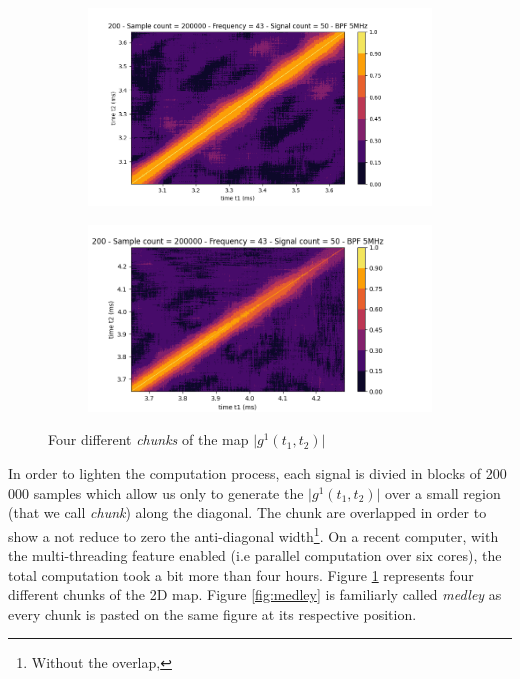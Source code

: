 \documentclass[11pt]{report}
\begin{document}
\begin{figure}[h!]
\centering
\begin{subfigure}{.48\textwidth}
  \centering
  \includegraphics[width=1.1\linewidth]{sp-g12-4}
\end{subfigure}%
\hspace{1em}%
\begin{subfigure}{.48\textwidth}
  \centering
  \includegraphics[width=1.1\linewidth]{sp-g12-2}
\end{subfigure}
\caption{Four different \textit{chunks} of the map $\vert g^1(t_1, t_2) \vert$}
\label{fig:sp-g12}
\end{figure}

In order to lighten the computation process, each signal is divied in blocks of 200 000 samples which allow us only to generate the $\vert g^1(t_1, t_2) \vert$ over a small region (that we call \textit{chunk}) along the diagonal. The chunk are overlapped in order to show a not reduce to zero the anti-diagonal width\footnote{Without the overlap, }. On a recent computer, with the multi-threading feature enabled (i.e parallel computation over six cores), the total computation took a bit more than four hours. Figure \ref{fig:sp-g12} represents four different chunks of the 2D map. Figure \ref{fig:medley} is familiarly called \textit{medley} as every chunk is pasted on the same figure at its respective position.
\end{document}
